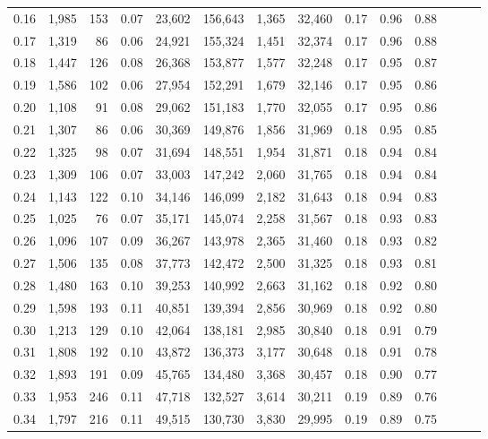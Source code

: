 \begin{tabular}{rrrrrrrrrrrrrr}
0.16 &  1,985 &  153 &  0.07 &   23,602 &  156,643 &   1,365 &  32,460 &  0.17 &  0.96 &      0.88 \\
0.17 &  1,319 &   86 &  0.06 &   24,921 &  155,324 &   1,451 &  32,374 &  0.17 &  0.96 &      0.88 \\
0.18 &  1,447 &  126 &  0.08 &   26,368 &  153,877 &   1,577 &  32,248 &  0.17 &  0.95 &      0.87 \\
0.19 &  1,586 &  102 &  0.06 &   27,954 &  152,291 &   1,679 &  32,146 &  0.17 &  0.95 &      0.86 \\
0.20 &  1,108 &   91 &  0.08 &   29,062 &  151,183 &   1,770 &  32,055 &  0.17 &  0.95 &      0.86 \\
0.21 &  1,307 &   86 &  0.06 &   30,369 &  149,876 &   1,856 &  31,969 &  0.18 &  0.95 &      0.85 \\
0.22 &  1,325 &   98 &  0.07 &   31,694 &  148,551 &   1,954 &  31,871 &  0.18 &  0.94 &      0.84 \\
0.23 &  1,309 &  106 &  0.07 &   33,003 &  147,242 &   2,060 &  31,765 &  0.18 &  0.94 &      0.84 \\
0.24 &  1,143 &  122 &  0.10 &   34,146 &  146,099 &   2,182 &  31,643 &  0.18 &  0.94 &      0.83 \\
0.25 &  1,025 &   76 &  0.07 &   35,171 &  145,074 &   2,258 &  31,567 &  0.18 &  0.93 &      0.83 \\
0.26 &  1,096 &  107 &  0.09 &   36,267 &  143,978 &   2,365 &  31,460 &  0.18 &  0.93 &      0.82 \\
0.27 &  1,506 &  135 &  0.08 &   37,773 &  142,472 &   2,500 &  31,325 &  0.18 &  0.93 &      0.81 \\
0.28 &  1,480 &  163 &  0.10 &   39,253 &  140,992 &   2,663 &  31,162 &  0.18 &  0.92 &      0.80 \\
0.29 &  1,598 &  193 &  0.11 &   40,851 &  139,394 &   2,856 &  30,969 &  0.18 &  0.92 &      0.80 \\
0.30 &  1,213 &  129 &  0.10 &   42,064 &  138,181 &   2,985 &  30,840 &  0.18 &  0.91 &      0.79 \\
0.31 &  1,808 &  192 &  0.10 &   43,872 &  136,373 &   3,177 &  30,648 &  0.18 &  0.91 &      0.78 \\
0.32 &  1,893 &  191 &  0.09 &   45,765 &  134,480 &   3,368 &  30,457 &  0.18 &  0.90 &      0.77 \\
0.33 &  1,953 &  246 &  0.11 &   47,718 &  132,527 &   3,614 &  30,211 &  0.19 &  0.89 &      0.76 \\
0.34 &  1,797 &  216 &  0.11 &   49,515 &  130,730 &   3,830 &  29,995 &  0.19 &  0.89 &      0.75 \\

\end{tabular}
